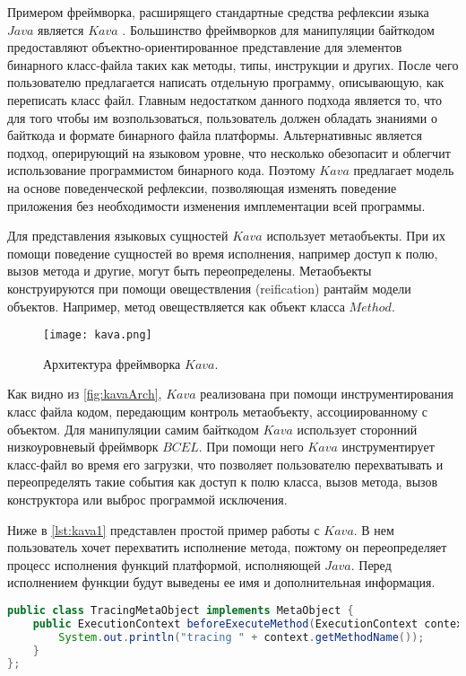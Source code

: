 Примером фреймворка, расширящего стандартные средства рефлексии языка $Java$ является $Kava$ \cite{kava1} \cite{kava2}. Большинство фреймворков для манипуляции байткодом предоставляют объектно-ориентированное представление для элементов бинарного класс-файла таких как методы, типы, инструкции и других. После чего пользователю предлагается написать отдельную программу, описывающую, как переписать класс файл. Главным недостатком данного подхода является то, что для того чтобы им возпользоваться, пользователь должен обладать знаниями о байткода и формате бинарного файла платформы. Альтернативныс является подход, оперирующий на языковом уровне, что несколько обезопасит и облегчит использование программистом бинарного кода. Поэтому $Kava$ предлагает модель на основе поведенческой рефлексии, позволяющая изменять поведение приложения без необходимости изменения имплементации всей программы.

Для представления языковых сущностей $Kava$ использует метаобъекты. При их помощи поведение сущностей во время исполнения, например доступ к полю, вызов метода и другие, могут быть переопределены. Метаобъекты конструируются при помощи овеществления (reification) рантайм модели объектов. Например, метод овеществляется как объект класса $Method$.

\begin{figure}[h]
\centering
\texttt{[image: kava.png]}
\caption{Архитектура фреймворка $Kava$.}
\label{fig:kavaArch}
\end{figure}

Как видно из \autoref{fig:kavaArch}, $Kava$ реализована при помощи инструментирования класс файла кодом, передающим контроль метаобъекту, ассоциированному с объектом. Для манипуляции самим байткодом $Kava$ использует сторонний низкоуровневый фреймворк $BCEL$. При помощи него $Kava$ инструментирует класс-файл во время его загрузки, что позволяет пользователю перехватывать и переопределять такие события как доступ к полю класса, вызов метода, вызов конструктора или выброс программой исключения.

Ниже в \autoref{lst:kava1} представлен простой пример работы с $Kava$. В нем пользователь хочет перехватить исполнение метода, пожтому он переопределяет процесс исполнения функций платформой, исполняющей $Java$. Перед исполнением функции будут выведены ее имя и дополнительная информация.

\begin{lstlisting}[language=Java, caption=Объявление метаобъекта в $Kava$, label=lst:kava1]
public class TracingMetaObject implements MetaObject {
    public ExecutionContext beforeExecuteMethod(ExecutionContext context) {
        System.out.println("tracing " + context.getMethodName());
    }
};
\end{lstlisting}

